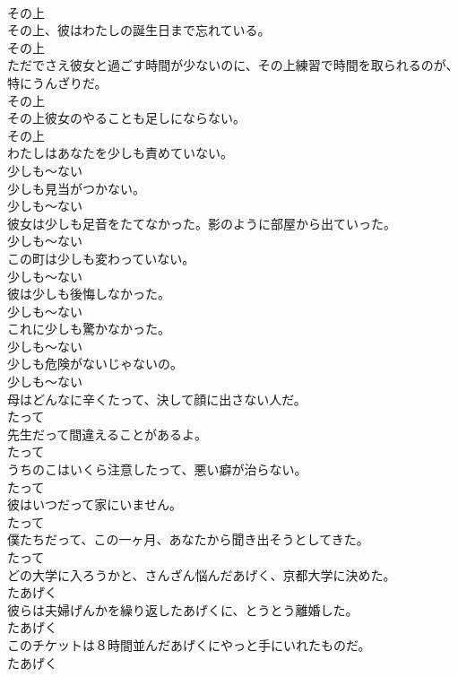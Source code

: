 \documentclass[8pt]{extreport}
\begin{document}
\begin{CJK}{UTF8}{min}
\\	その上	
\\	その上、彼はわたしの誕生日まで忘れている。	
\\	その上	
\\	ただでさえ彼女と過ごす時間が少ないのに、その上練習で時間を取られるのが、特にうんざりだ。	
\\	その上	
\\	その上彼女のやることも足しにならない。	
\\	その上	
\\	わたしはあなたを少しも責めていない。	
\\	少しも～ない	
\\	少しも見当がつかない。	
\\	少しも～ない	
\\	彼女は少しも足音をたてなかった。影のように部屋から出ていった。	
\\	少しも～ない	
\\	この町は少しも変わっていない。	
\\	少しも～ない	
\\	彼は少しも後悔しなかった。	
\\	少しも～ない	
\\	これに少しも驚かなかった。	
\\	少しも～ない	
\\	少しも危険がないじゃないの。	
\\	少しも～ない	
\\	母はどんなに辛くたって、決して顔に出さない人だ。	
\\	たって	
\\	先生だって間違えることがあるよ。	
\\	たって	
\\	うちのこはいくら注意したって、悪い癖が治らない。	
\\	たって	
\\	彼はいつだって家にいません。	
\\	たって	
\\	僕たちだって、この一ヶ月、あなたから聞き出そうとしてきた。	
\\	たって	
\\	どの大学に入ろうかと、さんざん悩んだあげく、京都大学に決めた。	
\\	たあげく	
\\	彼らは夫婦げんかを繰り返したあげくに、とうとう離婚した。	
\\	たあげく	
\\	このチケットは８時間並んだあげくにやっと手にいれたものだ。	
\\	たあげく	

\end{CJK}
\end{document}
